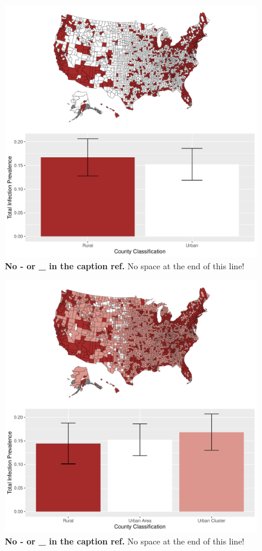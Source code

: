 \documentclass[
  12pt,
]{article}
\begin{document}
\begin{figure}[H]

{\centering \includegraphics{Final-Manuscript_files/figure-latex/figS2-1} 

}

\caption{\textbf{No - or \_ in the caption ref.} No space at the end of this line!}\label{fig:figS2}
\end{figure}



\begin{figure}[H]

{\centering \includegraphics{Final-Manuscript_files/figure-latex/figS3-1} 

}

\caption{\textbf{No - or \_ in the caption ref.} No space at the end of this line!}\label{fig:figS3}
\end{figure}
\end{document}

